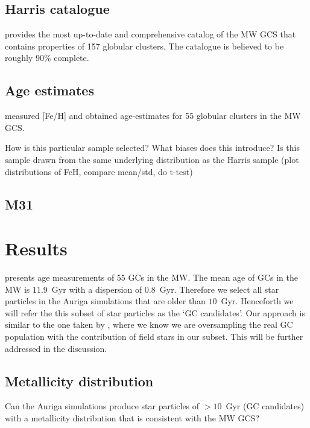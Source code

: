 \documentclass[a4paper,fleqn,usenatbib]{mnras}
\begin{document}
\subsection{Harris catalogue}
\label{sec:harris}
\citet[][2010 edition]{1996AJ....112.1487H} provides the most up-to-date and comprehensive catalog of the MW GCS that contains properties of 157 globular clusters. The catalogue is believed to be roughly 90\% complete.

\subsection{Age estimates}
\label{sec:vandenberg}
\citet{2013ApJ...775..134V} measured [Fe/H] and obtained age-estimates for 55 globular clusters in the MW GCS.


How is this particular sample selected? What biases does this introduce?
Is this sample drawn from the same underlying distribution as the Harris sample (plot distributions of FeH, compare mean/std, do t-test)

\subsection{M31}
\label{sec:m31}
\citep{2011AJ....141...61C}
\citep{2014MNRAS.442.2165H, 2014MNRAS.442.2929V}




\section{Results}
\label{sec:results}
\citet{2013ApJ...775..134V} presents age measurements of 55 GCs in the MW. The
mean age of GCs in the MW is $11.9$~Gyr with a dispersion of $0.8$~Gyr. 
Therefore we select all star particles in the Auriga simulations that are older 
than $10$~Gyr. Henceforth we will refer the this subset of star particles as the 
`GC candidates'. Our approach is similar to the one taken by \citep{2017MNRAS.465.3622R},
where we know we are oversampling the real GC population with the contribution
of field stars in our subset. This will be further addressed in the discussion.

\subsection{Metallicity distribution}
\label{sec:metallicity}

Can the Auriga simulations produce star particles of $>10$~Gyr (GC candidates) with a metallicity distribution that is consistent with the MW GCS?
\end{document}
